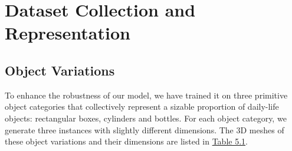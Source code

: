 \documentclass[12pt, a4paper]{report}
\theoremstyle{definition}
\begin{document}
\section{Dataset Collection and Representation}
\label{sec:5.2}


\subsection{Object Variations}
\label{sec:5.2.1}
To enhance the robustness of our model, we have trained it on three primitive object categories that collectively represent a sizable proportion of daily-life objects: rectangular boxes, cylinders and bottles. For each object category, we generate three instances with slightly different dimensions. The 3D meshes of these object variations and their dimensions are listed in \hyperref[tbl:5.1]{Table 5.1}.
\end{document}
